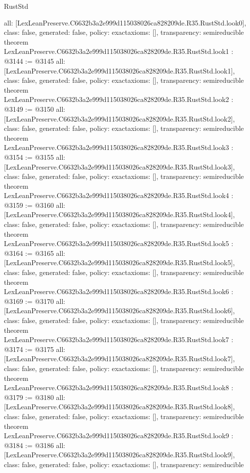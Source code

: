 \begin{lexlean}{RustStd}
\begin{coremodule}
{  all: [LexLeanPreserve.C6632b3a2e999d115038026ca828209de.R35.RustStd.look0],
  class: false,
  generated: false,
  policy: exact{axioms: []},
  transparency: semireducible
}
theorem LexLeanPreserve.C6632b3a2e999d115038026ca828209de.R35.RustStd.look1 : @3144 := @3145 {
  all: [LexLeanPreserve.C6632b3a2e999d115038026ca828209de.R35.RustStd.look1],
  class: false,
  generated: false,
  policy: exact{axioms: []},
  transparency: semireducible
}
theorem LexLeanPreserve.C6632b3a2e999d115038026ca828209de.R35.RustStd.look2 : @3149 := @3150 {
  all: [LexLeanPreserve.C6632b3a2e999d115038026ca828209de.R35.RustStd.look2],
  class: false,
  generated: false,
  policy: exact{axioms: []},
  transparency: semireducible
}
theorem LexLeanPreserve.C6632b3a2e999d115038026ca828209de.R35.RustStd.look3 : @3154 := @3155 {
  all: [LexLeanPreserve.C6632b3a2e999d115038026ca828209de.R35.RustStd.look3],
  class: false,
  generated: false,
  policy: exact{axioms: []},
  transparency: semireducible
}
theorem LexLeanPreserve.C6632b3a2e999d115038026ca828209de.R35.RustStd.look4 : @3159 := @3160 {
  all: [LexLeanPreserve.C6632b3a2e999d115038026ca828209de.R35.RustStd.look4],
  class: false,
  generated: false,
  policy: exact{axioms: []},
  transparency: semireducible
}
theorem LexLeanPreserve.C6632b3a2e999d115038026ca828209de.R35.RustStd.look5 : @3164 := @3165 {
  all: [LexLeanPreserve.C6632b3a2e999d115038026ca828209de.R35.RustStd.look5],
  class: false,
  generated: false,
  policy: exact{axioms: []},
  transparency: semireducible
}
theorem LexLeanPreserve.C6632b3a2e999d115038026ca828209de.R35.RustStd.look6 : @3169 := @3170 {
  all: [LexLeanPreserve.C6632b3a2e999d115038026ca828209de.R35.RustStd.look6],
  class: false,
  generated: false,
  policy: exact{axioms: []},
  transparency: semireducible
}
theorem LexLeanPreserve.C6632b3a2e999d115038026ca828209de.R35.RustStd.look7 : @3174 := @3175 {
  all: [LexLeanPreserve.C6632b3a2e999d115038026ca828209de.R35.RustStd.look7],
  class: false,
  generated: false,
  policy: exact{axioms: []},
  transparency: semireducible
}
theorem LexLeanPreserve.C6632b3a2e999d115038026ca828209de.R35.RustStd.look8 : @3179 := @3180 {
  all: [LexLeanPreserve.C6632b3a2e999d115038026ca828209de.R35.RustStd.look8],
  class: false,
  generated: false,
  policy: exact{axioms: []},
  transparency: semireducible
}
theorem LexLeanPreserve.C6632b3a2e999d115038026ca828209de.R35.RustStd.look9 : @3184 := @3186 {
  all: [LexLeanPreserve.C6632b3a2e999d115038026ca828209de.R35.RustStd.look9],
  class: false,
  generated: false,
  policy: exact{axioms: []},
  transparency: semireducible
}
\end{coremodule}
\end{lexlean}
